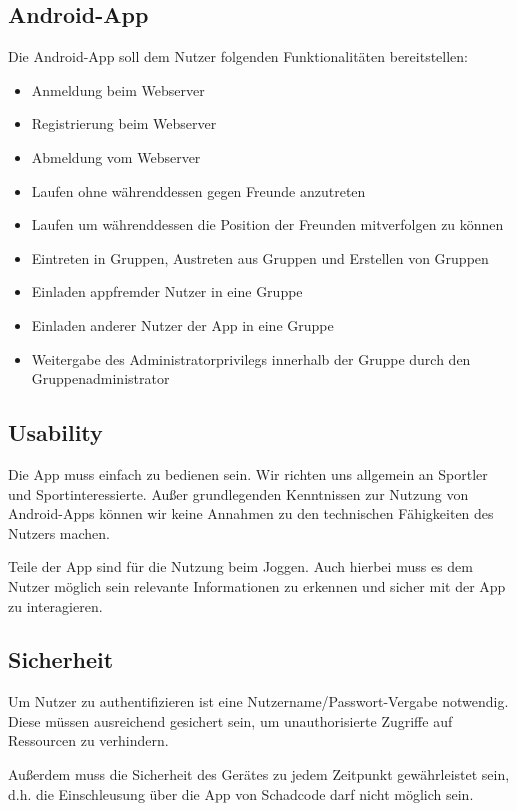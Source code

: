 \subsection{Android-App}
Die Android-App soll dem Nutzer folgenden Funktionalitäten bereitstellen:
\begin{itemize}
\item Anmeldung beim Webserver
\item Registrierung beim Webserver
\item Abmeldung vom Webserver
\item Laufen ohne währenddessen gegen Freunde anzutreten
\item Laufen um währenddessen die Position der Freunden mitverfolgen zu können
\item Eintreten in Gruppen, Austreten aus Gruppen und Erstellen von Gruppen
\item Einladen appfremder Nutzer in eine Gruppe
\item Einladen anderer Nutzer der App in eine Gruppe
\item Weitergabe des Administratorprivilegs innerhalb der Gruppe durch den Gruppenadministrator
\end{itemize}

\subsection{Usability}
Die App muss einfach zu bedienen sein. Wir richten uns allgemein an Sportler und Sportinteressierte. Außer grundlegenden Kenntnissen zur Nutzung von Android-Apps können wir keine Annahmen zu den technischen Fähigkeiten des Nutzers machen.

Teile der App sind für die Nutzung beim Joggen. Auch hierbei muss es dem Nutzer möglich sein relevante Informationen zu erkennen und sicher mit der App zu interagieren.

\subsection{Sicherheit}
Um Nutzer zu authentifizieren ist eine Nutzername/Passwort-Vergabe notwendig. Diese müssen ausreichend gesichert sein, um unauthorisierte Zugriffe auf Ressourcen zu verhindern. 

Außerdem muss die Sicherheit des Gerätes zu jedem Zeitpunkt gewährleistet sein, d.h. die Einschleusung über die App von Schadcode darf nicht möglich sein.

